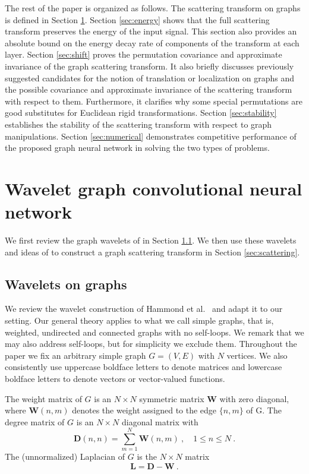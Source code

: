 \documentclass{article}
\def\BD{\boldsymbol{D}}
\def\BL{\boldsymbol{L}}
\def\BW{\boldsymbol{W}}
\begin{document}
The rest of the paper is organized as follows. The scattering transform on graphs is defined in Section \ref{sec:wgcn}. Section \ref{sec:energy} shows that the full scattering transform preserves the energy of the input signal. This section also provides an absolute bound on the energy decay rate of components of the transform at each layer. Section \ref{sec:shift} proves the permutation covariance and approximate invariance of the {graph} scattering transform. It also briefly discusses {previously suggested candidates for the notion of translation or localization on graphs and} the possible covariance and approximate invariance of the scattering transform with respect to them. {Furthermore,
it clarifies why some special permutations are good substitutes for Euclidean rigid transformations.} Section \ref{sec:stability} establishes the stability of the scattering transform with respect to graph manipulations. Section \ref{sec:numerical} demonstrates competitive performance of the proposed graph neural network in solving the two types of problems. 

\section{Wavelet graph convolutional neural network}\label{sec:wgcn}
We first review the graph wavelets of \cite{HamVG11} in Section \ref{sec:wavelet}. We then use these wavelets and ideas of \cite{Mal13} to construct a graph scattering transform in Section \ref{sec:scattering}.  

\subsection{Wavelets on graphs}\label{sec:wavelet}
We review the wavelet construction of Hammond et al.~\cite{HamVG11} and adapt it to our setting. Our general theory applies to what we call simple graphs, that is, weighted, undirected and connected graphs with no self-loops. We remark that we may also address self-loops, but for simplicity we exclude them. Throughout the paper we fix an arbitrary simple graph $G = (V,E)$ with $N$ vertices. We also consistently use uppercase boldface letters to denote matrices and lowercase boldface letters to denote vectors or vector-valued functions. 

The weight matrix of $G$ is an $N \times N$ symmetric matrix $\BW$ with zero diagonal, where $\BW(n,m)$ denotes the weight assigned to the edge $\{n, m\}$ of G.
The degree matrix of $G$ is an $N \times N$ diagonal matrix with
\begin{equation}
\BD(n,n) = \sum_{m=1}^N \BW(n,m) ~, \quad 1 \leq n \leq N ~.
\end{equation}
The (unnormalized) Laplacian of $G$ is the $N \times N$ matrix 
\begin{equation}
\BL = \BD - \BW ~.
\end{equation}
\end{document}
